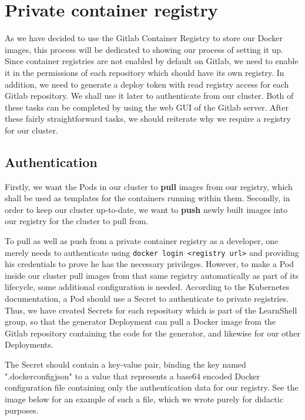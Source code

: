 \documentclass[thesis=B,english]{FITthesis}[2019/12/23]
\begin{document}
\section{Private container registry}

As we have decided to use the Gitlab Container Registry to store our Docker images, this process will be dedicated to showing our process of setting it up. 
Since container registries are not enabled by default on Gitlab, we need to enable it in the permissions of each repository which should have its own registry. In addition, we need to generate a deploy token with read registry access for each Gitlab repository. We shall use it later to authenticate from our cluster. Both of these tasks can be completed by using the web GUI of the Gitlab server. After these fairly straightforward tasks, we should reiterate why we require a registry for our cluster.

\subsection{Authentication}

Firstly, we want the Pods in our cluster to \textbf{pull} images from our registry, which shall be used as templates for the containers running within them. Secondly, in order to keep our cluster up-to-date, we want to \textbf{push} newly built images into our registry for the cluster to pull from. 

To pull as well as push from a private container registry as a developer, one merely needs to authenticate using \verb|docker login <registry url>| and providing his credentials to prove he has the necessary privileges. However, to make a Pod inside our cluster pull images from that same registry automatically as part of its lifecycle, some additional configuration is needed. According to the Kubernetes documentation, a Pod should use a Secret to authenticate to private registries. Thus, we have created Secrets for each repository which is part of the LearnShell group, so that the generator Deployment can pull a Docker image from the Gitlab repository containing the code for the generator, and likewise for our other Deployments.

The Secret should contain a key-value pair, binding the key named ".dockerconfigjson" to a value that represents a base64 encoded Docker configuration file containing only the authentication data for our registry. See the image below for an example of such a file, which we wrote purely for didactic purposes.
\end{document}

